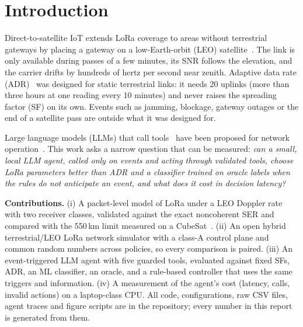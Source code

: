 \section{Introduction}
Direct-to-satellite IoT extends LoRa coverage to areas without terrestrial gateways by placing a
gateway on a low-Earth-orbit (LEO) satellite~\cite{fraire2019}. The link is only available during
passes of a few minutes, its SNR follows the elevation, and the carrier drifts by hundreds of hertz
per second near zenith. Adaptive data rate (ADR)~\cite{semtechADR} was designed for static
terrestrial links: it needs 20 uplinks (more than three hours at one reading every 10 minutes) and
never raises the spreading factor (SF) on its own. Events such as jamming, blockage, gateway outages
or the end of a satellite pass are outside what it was designed for.

Large language models (LLMs) that call tools~\cite{yao2023react} have been proposed for network
operation~\cite{maatouk2024}. This work asks a narrow question that can be measured:
\emph{can a small, local LLM agent, called only on events and acting through validated tools,
choose LoRa parameters better than ADR and a classifier trained on oracle labels when the rules do
not anticipate an event, and what does it cost in decision latency?}

\textbf{Contributions.}
(i) A packet-level model of LoRa under a LEO Doppler rate with two receiver classes, validated
against the exact noncoherent SER and compared with the 550\,km limit measured on a
CubeSat~\cite{doroshkin2019}.
(ii) An open hybrid terrestrial/LEO LoRa network simulator with a class-A control plane and common
random numbers across policies, so every comparison is paired.
(iii) An event-triggered LLM agent with five guarded tools, evaluated against fixed SFs, ADR, an ML
classifier, an oracle, and a rule-based controller that uses the same triggers and information.
(iv) A measurement of the agent's cost (latency, calls, invalid actions) on a laptop-class CPU.
All code, configurations, raw CSV files, agent traces and figure scripts are in the repository;
every number in this report is generated from them.
